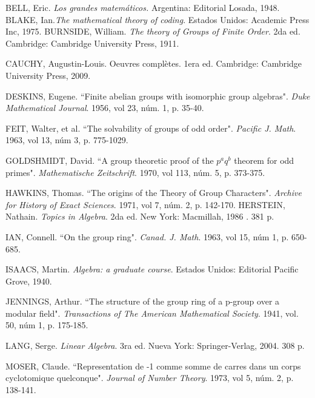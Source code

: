 \begin{thebibliography}{99}
     BELL, Eric. \textit{Los grandes matemáticos.} Argentina: Editorial Losada, 1948.
     BLAKE, Ian.\textit{The mathematical theory of coding}. Estados Unidos: Academic Press Inc, 1975.
     BURNSIDE, William. \textit{The theory of Groups of Finite Order}. 	2da ed. Cambridge: Cambridge University Press, 1911.
        
    
      CAUCHY, Augustin-Louis. Oeuvres complètes. 1era ed. Cambridge: Cambridge University Press, 2009.
     
      DESKINS, Eugene. ``Finite abelian groups with isomorphic group algebras". \textit{Duke Mathematical Journal}. 1956, vol 23, núm. 1, p. 35-40.
     
       FEIT, Walter, et al.  ``The solvability of groups of odd order". \textit{Pacific J. Math}. 1963, vol 13, núm 3, p. 775-1029.
      
      GOLDSHMIDT, David. ``A group theoretic proof of the $p^aq^b$ theorem for odd primes". \textit{Mathematische Zeitschrift}. 1970, vol 113, núm. 5, p. 373-375.
    
      HAWKINS, Thomas. ``The origins of the Theory of Group Characters". \textit{Archive for History of Exact Sciences}. 1971, vol 7, núm. 2, p. 142-170.
     HERSTEIN, Nathain. \textit{Topics in Algebra}. 2da ed.  New York: Macmillah, 1986 . 381 p. 
    
 	 IAN, Connell. ``On the group ring". \textit{Canad. J. Math}. 1963, vol 15, núm 1, p. 650-685.
 	
   ISAACS, Martin. \textit{Algebra: a graduate course}. Estados Unidos: Editorial Pacific Grove, 1940.   
   
    JENNINGS, Arthur. ``The structure of the group ring of a p-group over a modular field". \textit{Transactions of The American Mathematical Society}. 1941, vol. 50, núm 1, p. 175-185.
   
   
    LANG, Serge. \textit{Linear Algebra}. 3ra ed. Nueva York: Springer-Verlag, 2004. 308 p.
    
     MOSER, Claude. ``Representation de -1 comme somme de carres dans un corps cyclotomique quelconque". \textit{Journal of Number Theory}. 1973, vol 5, núm. 2, p. 138-141.
    

\end{thebibliography}
